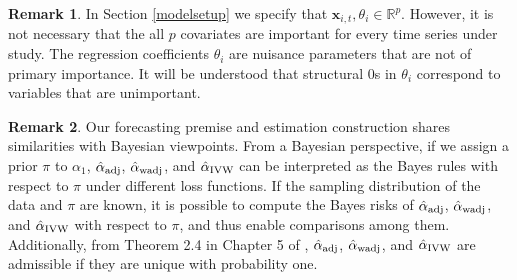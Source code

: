 \documentclass[11pt]{article}
\def\mbf#1{\mathbf{#1}} %
\newcommand{\reals}{\mathbb{R}} %
\theoremstyle{definition}
\newtheorem{remark}{Remark}
\begin{document}
\begin{remark}
In Section \ref{modelsetup} we specify that $\mbf{x}_{i,t}, \theta_i \in \reals^p$. 
However, it is not necessary that the all $p$ covariates are important for every time series under study. The regression coefficients $\theta_i$ are nuisance parameters that are not of primary importance. 
It will be understood that structural 0s in $\theta_i$ correspond to variables that are unimportant. 
\end{remark}

\begin{remark}
  Our forecasting premise and estimation construction shares similarities with Bayesian viewpoints. From a Bayesian perspective, if we assign a prior $\pi$ to $\alpha_1$, $\hat{\alpha}_{\rm adj}$, $\hat{\alpha}_{\rm wadj}$, and $\hat{\alpha}_{\rm IVW}$ can be interpreted as the Bayes rules with respect to $\pi$ under different loss functions. If the sampling distribution of the data and $\pi$ are known, it is possible to compute the Bayes risks of $\hat{\alpha}_{\rm adj}$, $\hat{\alpha}_{\rm wadj}$, and $\hat{\alpha}_{\rm IVW}$ with respect to $\pi$, and thus enable comparisons among them. Additionally, from Theorem 2.4 in Chapter 5 of \cite{lehmann2006theory}, $\hat{\alpha}_{\rm adj}$, $\hat{\alpha}_{\rm wadj}$, and $\hat{\alpha}_{\rm IVW}$ are admissible if they are unique with probability one.
\end{remark}
\end{document}
